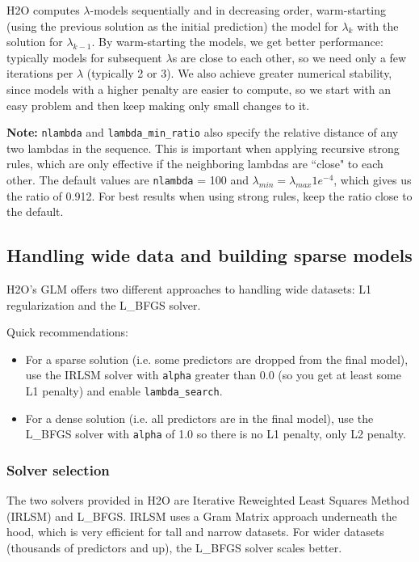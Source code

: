 H2O computes $\lambda$-models sequentially and in decreasing order, warm-starting (using the previous solution as
the initial prediction) the model for $\lambda_k$ with the solution for $\lambda_{k-1}$. By warm-starting the
models, we get better performance: typically models for subsequent $\lambda$s are close to each other, so we need
only a few iterations per $\lambda$ (typically 2 or 3). We also achieve greater numerical stability, since models
with a higher penalty are easier to compute, so we start with an easy problem and then keep making only small
changes to it.

\textbf{Note:} \texttt{nlambda} and \texttt{lambda\_min\_ratio} also specify the relative distance of any two
 lambdas in the sequence. This is important when applying recursive strong rules, which are only effective if the
neighboring lambdas are ``close" to each other. The default values are \texttt{nlambda} = 100 and $\lambda_{min}
= \lambda_{max} 1e^{-4}$, which gives us the ratio of 0.912.  For best results when using strong rules, keep the
ratio close to the default.

\subsection{Handling wide data and building sparse models}

H2O's GLM offers two different approaches to handling wide datasets:  L1 regularization and the L\_BFGS solver.

Quick recommendations:

\begin{itemize}
\item For a sparse solution (i.e. some predictors are dropped from the final model), use the IRLSM solver with 
      \texttt{alpha} greater than 0.0 (so you get at least some L1 penalty) and enable \texttt{lambda\_search}.

\item For a dense solution (i.e. all predictors are in the final model), use the L\_BFGS solver with
      \texttt{alpha} of 1.0 so there is no L1 penalty, only L2 penalty.
\end{itemize}

\subsubsection{Solver selection}

The two solvers provided in H2O are Iterative Reweighted Least Squares Method (IRLSM) and L\_BFGS.  IRLSM uses
a Gram Matrix approach underneath the hood, which is very efficient for tall and narrow datasets.  For wider 
datasets (thousands of predictors and up), the L\_BFGS solver scales better.

